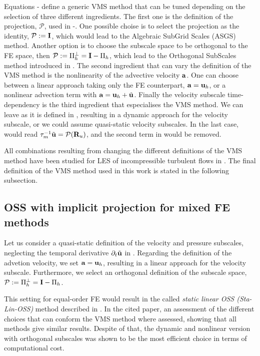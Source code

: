 Equations - define a generic VMS method that can be tuned depending on the selection of three different ingredients. The first one is the definition of the projection, $ \mathcal{P} $, used in -. One possible choise is to select the projection as the identity, $\mathcal{P}:=\mathbf{I}$, which would lead to the Algebraic SubGrid Scales (ASGS) method. Another option is to choose the subscale space to be orthogonal to the FE space, then $ \mathcal{P}:=\Pi^\perp_h=\mathbf{I}-\Pi_h $, which lead to the Orthogonal SubScales method introduced in \cite{codina_stabilization_2000}. The second ingredient that can vary the definition of the VMS method is the nonlinearity of the advective velocity $ {\bf a} $. One can choose between a linear approach taking only the FE counterpart, $ {\bf a}={\bf u}_h $, or a nonlinear advection term with $ {\bf a}={\bf u}_h+\tilde{{\bf u}} $. Finally the velocity subscale time-dependency is the third ingredient that especialises the VMS method. We can leave as it is defined in , resulting in a dynamic approach for the velocity subscale, or we could assume quasi-static velocity subscales. In the last case,  would read $ \tau_m^{-1}\tilde{{\bf u}}=\mathcal{P}({\bf R}_u)$, and the second term in  would be removed.

All combinations resulting from changing the different definitions of the VMS method have been studied for LES of incompressible turbulent flows in \cite{colomes_assessment_2015}. The final definition of the VMS method used in this work is stated in the following subsection.

\subsection{OSS with implicit projection for mixed FE methods}
\label{subsec-C7_OSS_mixed}
Let us consider a quasi-static definition of the velocity and pressure subscales, neglecting the temporal derivative $ \partial_t\tilde{{\bf u}} $ in . Regarding the definition of the advetion velocity, we set $ {\bf a}={\bf u}_h $, resulting in a linear approach for the velocity subscale. Furthermore, we select an orthogonal definition of the subscale space, $ \mathcal{P}:=\Pi_h^\perp=\mathbf{I}-\Pi_h $.

This setting for equal-order FE would result in the called \textit{static linear OSS (Sta-Lin-OSS)} method described in \cite{colomes_assessment_2015}. In the cited paper, an assessment of the different choices that can conform the VMS method where assessed, showing that all methods give similar results.  Despite of that, the dynamic and nonlinear version with orthogonal subscales was shown to be the most efficient choice in terms of computational cost.

